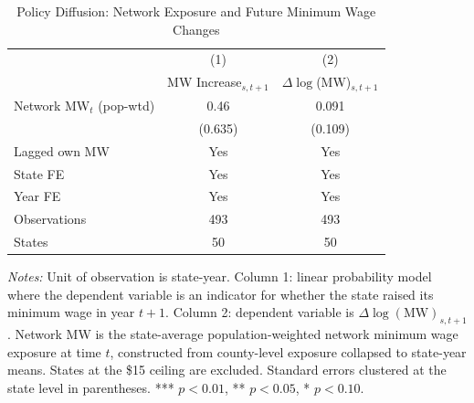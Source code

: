 \begin{table}[t]
\centering
\caption{Policy Diffusion: Network Exposure and Future Minimum Wage Changes}
\label{tab:diffusion}
\begin{threeparttable}
\begin{tabular}{lcc}
\toprule
 & (1) & (2) \\
 & MW Increase$_{s,t+1}$ & $\Delta\log$(MW)$_{s,t+1}$ \\
\midrule
Network MW$_t$ (pop-wtd) & 0.46 & 0.091 \\
 & (0.635) & (0.109) \\
\addlinespace
Lagged own MW & Yes & Yes \\
State FE & Yes & Yes \\
Year FE & Yes & Yes \\
Observations & 493 & 493 \\
States & 50 & 50 \\
\bottomrule
\end{tabular}
\begin{tablenotes}[flushleft]
\small
\item \textit{Notes:} Unit of observation is state-year. Column 1: linear probability model where the dependent variable is an indicator for whether the state raised its minimum wage in year $t+1$. Column 2: dependent variable is $\Delta\log(\text{MW})_{s,t+1}$. Network MW is the state-average population-weighted network minimum wage exposure at time $t$, constructed from county-level exposure collapsed to state-year means. States at the \$15 ceiling are excluded. Standard errors clustered at the state level in parentheses. *** $p<0.01$, ** $p<0.05$, * $p<0.10$.
\end{tablenotes}
\end{threeparttable}
\end{table}
